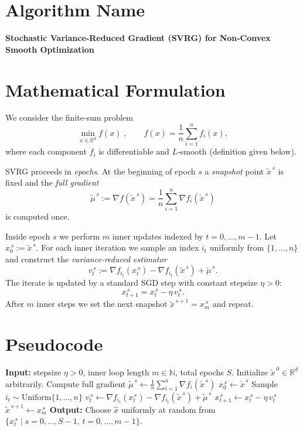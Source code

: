 \documentclass{article}
\newcommand{\RR}{\mathbb{R}}
\begin{document}
\section*{Algorithm Name}
\textbf{Stochastic Variance‑Reduced Gradient (SVRG) for Non‑Convex Smooth Optimization}

\section*{Mathematical Formulation}
We consider the finite‑sum problem  
\[
\min_{x\in\RR^{d}} f(x)\;,\qquad 
f(x)=\frac{1}{n}\sum_{i=1}^{n} f_i(x),
\]
where each component $f_i$ is differentiable and $L$‑smooth (definition given below).  

SVRG proceeds in \emph{epochs}.  
At the beginning of epoch $s$ a \emph{snapshot} point $\tilde{x}^{\,s}$ is fixed and the \emph{full gradient}
\[
\tilde{\mu}^{\,s}:=\nabla f(\tilde{x}^{\,s})=\frac{1}{n}\sum_{i=1}^{n}\nabla f_i(\tilde{x}^{\,s})
\tag{1}
\]
is computed once.  

Inside epoch $s$ we perform $m$ inner updates indexed by $t=0,\dots,m-1$.
Let $x_{0}^{\,s}:=\tilde{x}^{\,s}$.  For each inner iteration we sample an index $i_t$ uniformly from $\{1,\dots,n\}$ and construct the \emph{variance‑reduced estimator}
\[
v_t^{\,s}:=\nabla f_{i_t}(x_{t}^{\,s})-\nabla f_{i_t}(\tilde{x}^{\,s})+\tilde{\mu}^{\,s}.
\tag{2}
\]
The iterate is updated by a standard SGD step with constant stepsize $\eta>0$:
\[
x_{t+1}^{\,s}=x_{t}^{\,s}-\eta\,v_t^{\,s}.
\tag{3}
\]
After $m$ inner steps we set the next snapshot $\tilde{x}^{\,s+1}=x_{m}^{\,s}$ and repeat.

\section*{Pseudocode}
\begin{algorithm}[H]
\caption{SVRG for Non‑Convex $L$‑smooth Objectives}
\begin{algorithmic}[1]
\State \textbf{Input:} stepsize $\eta>0$, inner loop length $m\in\mathbb{N}$, total epochs $S$.
\State Initialize $ \tilde{x}^{\,0}\in\RR^{d}$ arbitrarily.
    \State Compute full gradient $\displaystyle \tilde{\mu}^{\,s}\gets\frac{1}{n}\sum_{i=1}^{n}\nabla f_i(\tilde{x}^{\,s})$  
    \State $x_{0}^{\,s}\gets\tilde{x}^{\,s}$
        \State Sample $i_t\sim\text{Uniform}\{1,\dots,n\}$
        \State $v_t^{\,s}\gets\nabla f_{i_t}(x_{t}^{\,s})-\nabla f_{i_t}(\tilde{x}^{\,s})+\tilde{\mu}^{\,s}$
        \State $x_{t+1}^{\,s}\gets x_{t}^{\,s}-\eta\,v_t^{\,s}$
    \EndFor
    \State $\tilde{x}^{\,s+1}\gets x_{m}^{\,s}$
\EndFor
\State \textbf{Output:} Choose $\hat{x}$ uniformly at random from $\{x_{t}^{\,s}\mid s=0,\dots,S-1,\,t=0,\dots,m-1\}$.
\end{algorithmic}
\end{algorithm}
\end{document}
